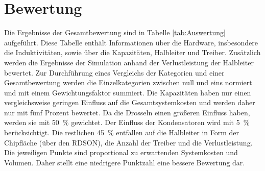 \section{Bewertung}
Die Ergebnisse der Gesamtbewertung sind in Tabelle \ref{tab:Auswertung} aufgeführt. Diese Tabelle enthält Informationen über die Hardware, insbesondere die Induktivitäten, sowie über die Kapazitäten, Halbleiter und Treiber. Zusätzlich werden die Ergebnisse der Simulation anhand der Verlustleistung der Halbleiter bewertet. Zur Durchführung eines Vergleichs der Kategorien und einer Gesamtbewertung werden die Einzelkategorien zwischen null und eins normiert und mit einem Gewichtungsfaktor summiert. Die Kapazitäten haben nur einen vergleichsweise geringen Einfluss auf die Gesamtsystemkosten und werden daher nur mit fünf Prozent bewertet. Da die Drosseln einen größeren Einfluss haben, werden sie mit 50~\% gewichtet. Der Einfluss der Kondensatoren wird mit 5~\% berücksichtigt. Die restlichen 45~\% entfallen auf die Halbleiter in Form der Chipfläche (über den RDSON), die Anzahl der Treiber und die Verlustleistung. Die jeweiligen Punkte sind proportional zu erwartenden Systemkosten und Volumen. Daher stellt eine niedrigere Punktzahl eine bessere Bewertung dar. \\
